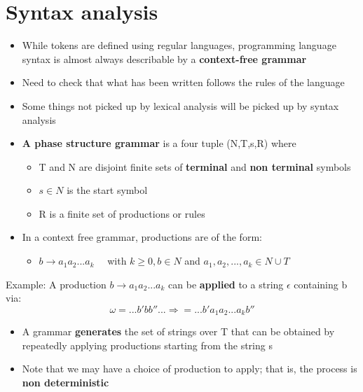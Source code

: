 \documentclass{article}[18pt]
\begin{document}
\section{Syntax analysis}
\begin{itemize}
\item While tokens are defined using regular languages, programming language syntax is almost always describable by a \textbf{context-free grammar}
\item Need to check that what has been written follows the rules of the language
\item Some things not picked up by lexical analysis will be picked up by syntax analysis
\item \textbf{A phase structure grammar} is a four tuple (N,T,s,R) where
\begin{itemize}
\item T and N are disjoint finite sets of \textbf{terminal} and \textbf{non terminal} symbols
\item $s\in N$ is the start symbol 
\item R is a finite set of productions or rules
\end{itemize}
\item In a context free grammar, productions are of the form:
\begin{itemize}
\item $b\rightarrow a_1a_2...a_k \quad$ with $k\geqslant0, b\in N$ and $a_1,a_2,...,a_k\in N\cup T$
\end{itemize}
\end{itemize}
Example: A production $b\rightarrow a_1a_2...a_k$ can be \textbf{applied} to a string $\epsilon$ containing b via:
$$\omega=...b'bb''... \Rightarrow = ...b'a_1a_2...a_kb''$$
\begin{itemize}
\item A grammar \textbf{generates} the set of strings over T that can be obtained by repeatedly applying productions starting from the string s
\item Note that we may have a choice of production to apply; that is, the process is \textbf{non deterministic}
\end{itemize}
\newpage
\end{document}
